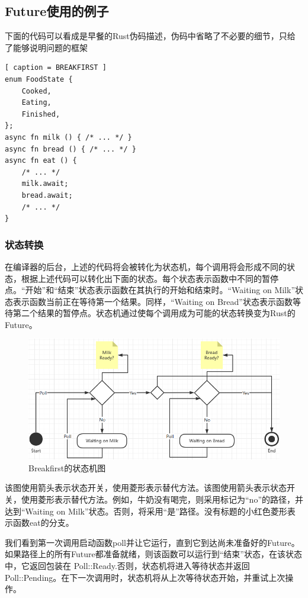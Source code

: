 \subsection{Future使用的例子}

下面的代码可以看成是早餐的Rust伪码描述，伪码中省略了不必要的细节，只给了能够说明问题的框架

\begin{lstlisting}[ caption = BREAKFIRST ]
enum FoodState {
    Cooked,
    Eating,
    Finished,
};
async fn milk () { /* ... */ }
async fn bread () { /* ... */ }
async fn eat () {
    /* ... */
    milk.await;
    bread.await;
    /* ... */
}

\end{lstlisting}

\subsubsection{状态转换}

在编译器的后台，上述的代码将会被转化为状态机，每个调用将会形成不同的状态，根据上述代码可以转化出下面的状态。每个状态表示函数中不同的暂停点。“开始”和“结束”状态表示函数在其执行的开始和结束时。“Waiting on Milk”状态表示函数当前正在等待第一个结果。同样，“Waiting on Bread”状态表示函数等待第二个结果的暂停点。状态机通过使每个调用成为可能的状态转换变为Rust的Future。

\begin{figure}[htb]
    \figureCapSet
    \centering
    \includegraphics[width=.8\linewidth]{figure/c2/breakfirststate.png}
    \caption{Breakfirst的状态机图}
    \label{figure:c2breakfirststate}
\end{figure}

该图使用箭头表示状态开关，使用菱形表示替代方法。该图使用箭头表示状态开关，使用菱形表示替代方法。例如，牛奶没有喝完，则采用标记为“no”的路径，并达到“Waiting on Milk”状态。否则，将采用“是”路径。没有标题的小红色菱形表示函数eat的分支。

我们看到第一次调用启动函数poll并让它运行，直到它到达尚未准备好的Future。如果路径上的所有Future都准备就绪，则该函数可以运行到“结束”状态，在该状态中，它返回包装在 Poll::Ready.否则，状态机将进入等待状态并返回Poll::Pending。在下一次调用时，状态机将从上次等待状态开始，并重试上次操作。


